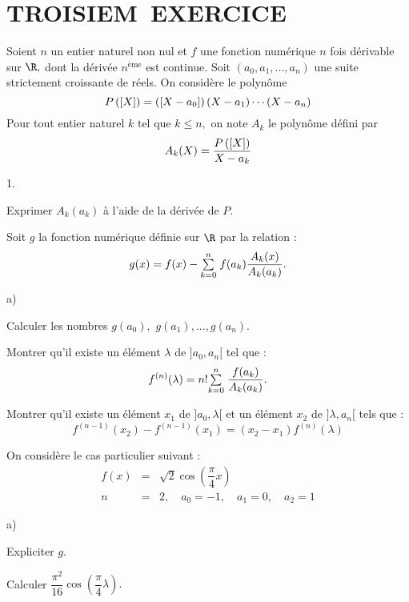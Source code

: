 \documentclass[11pt]{article}%
\begin{document}
\section*{TROISIEM\E\ EXERCICE}

Soient $n$ un entier naturel non nul et $f$ une fonction numérique $n$
fois dérivable sur $\R,$ dont la dérivée $n^{\text{ème}}$ est continue.
Soit $(a_{0},a_{1},...,a_{n})$ une suite strictement croissante de
réels. On
considère le polynôme
\[
P\left(\left[ {X} \right]\right) = \left(\left[ {X-a_{0}} \right]\right)(X-a_{1})\cdots
(X-a_{n})
\]
Pour tout entier naturel $k$ tel que $k\leq n,$ on note $A_{k}$ le
polynôme défini par 
\[
A_{k}(X) = \dfrac{P\left(\left[ {X} \right]\right)}{X-a_{k}}
\]

\begin{noliste}{1.}
 \setlength{\itemsep}{4mm}
\item Exprimer $A_{k}(a_{k})$ à l'aide de la dérivée de $P.$

\item Soit $g$ la fonction numérique définie sur $\R$ par la
relation :
\[
g(x) = f(x)-{\textstyle\sum\limits_{k = 0}^{n}}\hspace{.1cm}f(a_{k})\dfrac{A_{k}(x)}{A_{k}(a_{k})}.
\]

\begin{noliste}{a)}
 \setlength{\itemsep}{2mm}
\item Calculer les nombres $g(a_{0}),$ $g(a_{1}),...,g(a_{n}).$

\item Montrer qu'il existe un élément $\lambda $ de $]a_{0},a_{n}[$ tel
que :
\[
f^{(n)}(\lambda ) = n!{\textstyle\sum\limits_{k = 0}^{n}}\hspace{.1cm}\dfrac{f(a_{k})}{A_{k}(a_{k})}.
\]

\item Montrer qu'il existe un élément $x_{1}$ de $]a_{0},\lambda
\lbrack $
et un élément $x_{2}$ de $]\lambda,a_{n}[$ tels que :
\[
f^{(n-1)}(x_{2})-f^{(n-1)}(x_{1}) = (x_{2}-x_{1})f^{(n)}(\lambda )
\]
\end{noliste}

\item On considère le cas particulier suivant :\begin{eqnarray*}
f(x) & = & \sqrt{2}\cos (\dfrac{\pi }{4}x) \\
n & = & 2,\quad a_{0} = -1,\quad a_{1} = 0,\quad a_{2} = 1
\end{eqnarray*}

\begin{noliste}{a)}
 \setlength{\itemsep}{2mm}
\item Expliciter $g.$

\item Calculer $\dfrac{\pi ^{2}}{16}\cos (\dfrac{\pi }{4}\lambda ).$
\end{noliste}
\end{noliste}
\end{document}
